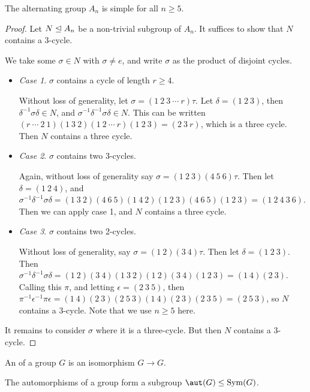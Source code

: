 \documentclass[a4paper]{scrartcl}
\begin{document}
\begin{theorem}[$A_n$ is Simple]
The alternating group $A_n$ is simple for all $n \geq 5$.
\end{theorem}
\begin{proof}
	Let $N \trianglelefteq A_n$ be a non-trivial subgroup of $A_n$. It suffices to show that $N$ contains a $3$-cycle.
	
	We take some $\sigma \in N$ with $\sigma \neq e$, and write $\sigma$ as the product of disjoint cycles.

	\begin{itemize}
		\item \emph{Case 1}. $\sigma$ contains a cycle of length $r \geq 4$.
	
		Without loss of generality, let $\sigma = (1\ 2\ 3\ \cdots\ r)\tau$. Let $\delta = (1\ 2\ 3)$, then $\delta^{-1} \sigma \delta \in N$, and $\sigma^{-1}\delta^{-1} \sigma \delta \in N$. This can be written $(r\ \cdots\ 2\ 1)(1\ 3\ 2)(1\ 2\ \cdots\ r)(1\ 2\ 3) = (2\ 3\ r)$, which is a three cycle. Then $N$ contains a three cycle.

		\item \emph{Case 2}. $\sigma$ contains two 3-cycles.
		
		Again, without loss of generality say $\sigma = (1\ 2\ 3)(4\ 5\ 6)\tau$. Then let $\delta = (1\ 2\ 4)$, and $\sigma^{-1}\delta^{-1}\sigma \delta = (1\ 3\ 2)(4\ 6\ 5) (1\ 4\ 2)(1\ 2\ 3)(4\ 6\ 5)(1\ 2\ 3) = (1\ 2\ 4\ 3\ 6)$. Then we can apply case 1, and $N$ contains a three cycle.
		\item \emph{Case 3}. $\sigma$ contains two 2-cycles.
		
		Without loss of generality, say $\sigma = (1\ 2)(3\ 4) \tau$. Then let $\delta = (1\ 2\ 3)$. Then $\sigma^{-1}\delta^{-1} \sigma \delta = (1\ 2)(3\ 4)(1\ 3\ 2)(1\ 2)(3\ 4)(1\ 2\ 3) = (1\ 4)(2\ 3)$. Calling this $\pi$, and letting $\epsilon = (2\ 3\ 5)$, then $\pi^{-1} \epsilon^{-1} \pi \epsilon = (1\ 4)(2\ 3)(2\ 5\ 3)(1\ 4)(2\ 3)(2\ 3\ 5) = (2\ 5\ 3)$, so $N$ contains a $3$-cycle. Note that we use $n \geq 5$ here. 
	\end{itemize}
	It remains to consider $\sigma$ where it is a three-cycle. But then $N$ contains a 3-cycle.
\end{proof}

\begin{definition}[Automorphism]
	An  of a group $G$ is an isomorphism $G \rightarrow G$.
\end{definition}

The automorphisms of a group form a subgroup $\aut(G) \leq \sym(G)$.
\end{document}
